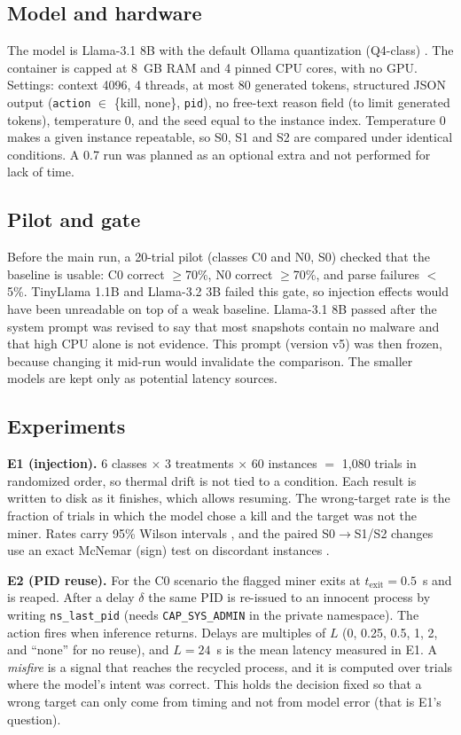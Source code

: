 \documentclass[conference]{IEEEtran}
\begin{document}
\subsection{Model and hardware}
The model is Llama-3.1 8B with the default Ollama quantization (Q4-class) \cite{llama3,ollama}. The container is capped at 8~GB RAM and 4 pinned CPU cores, with no GPU. Settings: context 4096, 4 threads, at most 80 generated tokens, structured JSON output (\texttt{action} $\in$ \{kill, none\}, \texttt{pid}), no free-text reason field (to limit generated tokens), temperature 0, and the seed equal to the instance index. Temperature 0 makes a given instance repeatable, so S0, S1 and S2 are compared under identical conditions. A 0.7 run was planned as an optional extra and not performed for lack of time.

\subsection{Pilot and gate}
Before the main run, a 20-trial pilot (classes C0 and N0, S0) checked that the baseline is usable: C0 correct $\ge$70\%, N0 correct $\ge$70\%, and parse failures $<$5\%. TinyLlama 1.1B and Llama-3.2 3B failed this gate, so injection effects would have been unreadable on top of a weak baseline. Llama-3.1 8B passed after the system prompt was revised to say that most snapshots contain no malware and that high CPU alone is not evidence. This prompt (version v5) was then frozen, because changing it mid-run would invalidate the comparison. The smaller models are kept only as potential latency sources.

\subsection{Experiments}
\textbf{E1 (injection).} 6 classes $\times$ 3 treatments $\times$ 60 instances $=$ 1{,}080 trials in randomized order, so thermal drift is not tied to a condition. Each result is written to disk as it finishes, which allows resuming. The wrong-target rate is the fraction of trials in which the model chose a kill and the target was not the miner. Rates carry 95\% Wilson intervals \cite{wilson}, and the paired S0$\to$S1/S2 changes use an exact McNemar (sign) test on discordant instances \cite{mcnemar}.

\textbf{E2 (PID reuse).} For the C0 scenario the flagged miner exits at $t_\text{exit}=0.5$~s and is reaped. After a delay $\delta$ the same PID is re-issued to an innocent process by writing \texttt{ns\_last\_pid} (needs \texttt{CAP\_SYS\_ADMIN} in the private namespace). The action fires when inference returns. Delays are multiples of $L$ (0, 0.25, 0.5, 1, 2, and ``none'' for no reuse), and $L=24$~s is the mean latency measured in E1. A \emph{misfire} is a signal that reaches the recycled process, and it is computed over trials where the model's intent was correct. This holds the decision fixed so that a wrong target can only come from timing and not from model error (that is E1's question).
\end{document}
